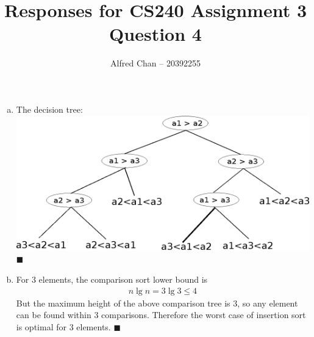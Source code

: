 \documentclass[12pt]{article}
\title{Responses for CS240 Assignment 3 Question 4}
\author{Alfred Chan -- 20392255}
\begin{document}
\maketitle
\begin{enumerate}[(a)]
\item
The decision tree:\\
\includegraphics[scale=0.8]{decision_tree.eps}
\hfill $\blacksquare$
\item
For 3 elements, the comparison sort lower bound is
\begin{align*}
n \lg n = 3 \lg 3 \le 4
\end{align*}
But the maximum height of the above comparison tree is 3, so any element can be found within 3 comparisons. Therefore the worst case of insertion sort is optimal for 3 elements.
\hfill $\blacksquare$
\end{enumerate}
\end{document}
